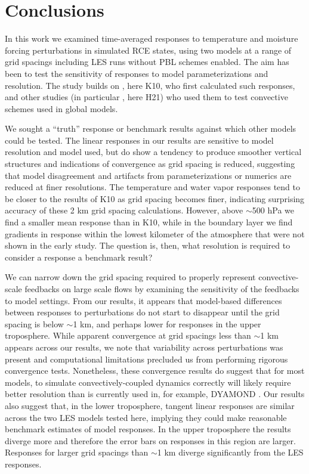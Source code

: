 \documentclass[draft]{agujournal2019}
\begin{document}
\section{Conclusions}
\label{sec:conclusions}

In this work we examined time-averaged responses to temperature and moisture
forcing perturbations in simulated RCE states, using two models at a range of
grid spacings including LES runs without PBL schemes enabled. The aim has been
to test the sensitivity of responses to model parameterizations and resolution.
The study builds on , here K10, who first calculated such
responses, and other studies (in particular , here H21)
who used them to test convective schemes used in global models.

We sought a ``truth'' response or benchmark results against which other models
could be tested. The linear responses in our results are sensitive to model
resolution and model used, but do show a tendency to produce smoother vertical
structures and indications of convergence as grid spacing is reduced, suggesting
that model disagreement and artifacts from parameterizations or numerics are
reduced at finer resolutions. The temperature and water vapor responses tend to
be closer to the results of K10 as grid spacing becomes finer, indicating
surprising accuracy of these 2 km grid spacing calculations. However, above
$\sim$500 hPa we find a smaller mean response than in K10, while in the boundary
layer we find gradients in response within the lowest kilometer of the
atmosphere that were not shown in the early study. The question is, then, what
resolution is required to consider a response a benchmark result?

We can narrow down the grid spacing required to properly represent
convective-scale feedbacks on large scale flows by examining the sensitivity of
the feedbacks to model settings. From our results, it appears that model-based
differences between responses to perturbations do not start to disappear until
the grid spacing is below $\sim$1 km, and perhaps lower for responses in the
upper troposphere. While apparent convergence at grid spacings less than $\sim$1
km appears across our results, we note that variability across perturbations was
present and computational limitations precluded us from performing rigorous
convergence tests. Nonetheless, these convergence results do suggest that for
most models, to simulate convectively-coupled dynamics correctly will likely
require better resolution than is currently used in, for example, DYAMOND
\cite{Stevens_PEPS_2019}. Our results also suggest that, in the lower
troposphere, tangent linear responses are similar across the two LES models
tested here, implying they could make reasonable benchmark estimates of model
responses. In the upper troposphere the results diverge more and therefore the
error bars on responses in this region are larger. Responses for larger grid
spacings than $\sim$1 km diverge significantly from the LES responses.
\end{document}
